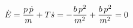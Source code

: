 \documentclass[preview]{standalone}
\begin{document}
\begin{align*}
\special{dvisvgm:raw <g id='unique000'>}\dot E=\frac{p\,\dot p}{m}+T\dot s=-\frac{b\,p^2}{m^2}+\frac{b\,p^2}{m^2}=0\special{dvisvgm:raw </g>}
\end{align*}
\end{document}
